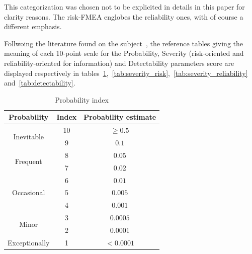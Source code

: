 This categorization was chosen not to be explicited in details in this paper for clarity reasons. The risk-FMEA englobes the reliability ones, with of course a different emphasis.

Follwoing the literature found on the subject~\cite{garcia2013}, the reference tables giving the meaning of each 10-point scale for the Probability, Severity (risk-oriented and reliability-oriented for information) and Detectability parameters score are displayed respectively in tables~\ref{tab:probability},~\ref{tab:severity_risk},~\ref{tab:severity_reliability} and~\ref{tab:detectability}.


\begin{table}[!htb]
    \centering
        \begin{tabular}{ ccc }
        \hline
        Probability & Index & Probability estimate \\ \hline\hline
        \multirow{2}{*}{Inevitable} & 10 & $\geq 0.5$\\
                                    & 9  & $0.1$ \\
        \multirow{2}{*}{Frequent}   & 8  & $0.05$\\
                                    & 7  & $0.02$ \\
        \multirow{3}{*}{Occasional}   & 6  & $0.01$\\
                                    & 5  & $0.005$ \\
                                    & 4  & $0.001$ \\
        \multirow{2}{*}{Minor}   & 3  & $0.0005$\\
                                    & 2  & $0.0001$ \\
        Exceptionally & 1  & $< 0.0001$ \\
                                     
        \end{tabular}
        \caption{Probability index}\label{tab:probability}
\end{table}

